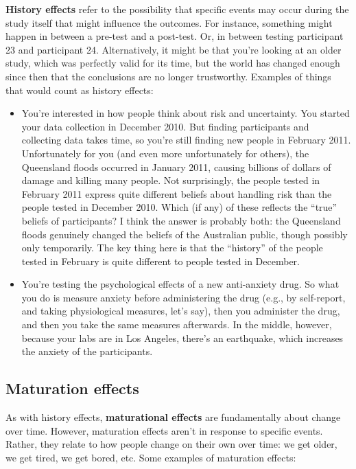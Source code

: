 \documentclass[
]{book}
\begin{document}
\textbf{History effects} refer to the possibility that specific events may occur during the study itself that might influence the outcomes. For instance, something might happen in between a pre-test and a post-test. Or, in between testing participant 23 and participant 24. Alternatively, it might be that you're looking at an older study, which was perfectly valid for its time, but the world has changed enough since then that the conclusions are no longer trustworthy. Examples of things that would count as history effects:

\begin{itemize}
\item
  You're interested in how people think about risk and uncertainty. You started your data collection in December 2010. But finding participants and collecting data takes time, so you're still finding new people in February 2011. Unfortunately for you (and even more unfortunately for others), the Queensland floods occurred in January 2011, causing billions of dollars of damage and killing many people. Not surprisingly, the people tested in February 2011 express quite different beliefs about handling risk than the people tested in December 2010. Which (if any) of these reflects the ``true'' beliefs of participants? I think the answer is probably both: the Queensland floods genuinely changed the beliefs of the Australian public, though possibly only temporarily. The key thing here is that the ``history'' of the people tested in February is quite different to people tested in December.
\item
  You're testing the psychological effects of a new anti-anxiety drug. So what you do is measure anxiety before administering the drug (e.g., by self-report, and taking physiological measures, let's say), then you administer the drug, and then you take the same measures afterwards. In the middle, however, because your labs are in Los Angeles, there's an earthquake, which increases the anxiety of the participants.
\end{itemize}

\hypertarget{maturation-effects}{%
\subsection{Maturation effects}\label{maturation-effects}}

As with history effects, \textbf{maturational effects} are fundamentally about change over time. However, maturation effects aren't in response to specific events. Rather, they relate to how people change on their own over time: we get older, we get tired, we get bored, etc. Some examples of maturation effects:
\end{document}
